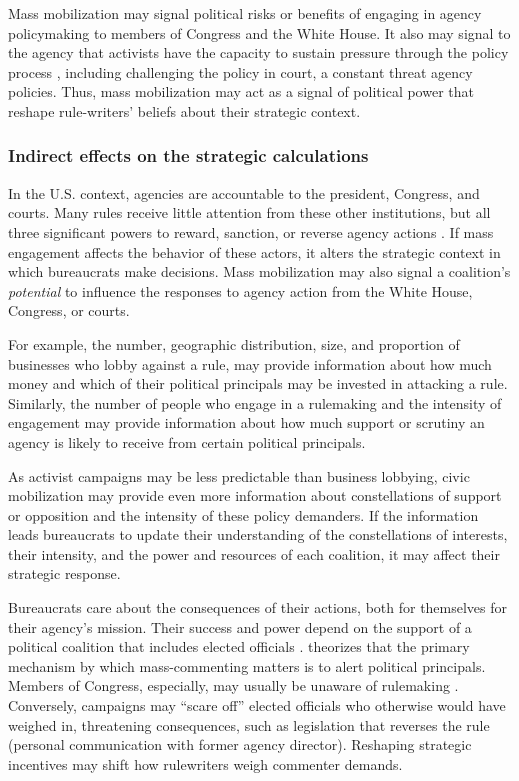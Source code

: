 Mass mobilization may signal political risks or benefits of engaging in agency policymaking to members of Congress and the White House. It also may signal to the agency that activists have the capacity to sustain pressure through the policy process \citep{Coglianese2001}, including challenging the policy in court, a constant threat agency policies. Thus, mass mobilization may act as a signal of political power that  reshape rule-writers' beliefs about their strategic context. 


\subsubsection{Indirect effects on the strategic calculations}
In the U.S. context, agencies are accountable to the president, Congress, and courts. Many rules receive little attention from these other institutions, but all three significant powers to reward, sanction, or reverse agency actions \citep{Yaver2016}. If mass engagement affects the behavior of these actors, it alters the strategic context in which bureaucrats make decisions.
Mass mobilization may also signal a coalition's \textit{potential} to influence the responses to agency action from the White House, Congress, or courts. 

For example, the number, geographic distribution, size, and proportion of businesses who lobby against a rule, may provide information about how much money and which of their political principals may be invested in attacking a rule. Similarly, the number of people who engage in a rulemaking and the intensity of engagement may provide information about how much support or scrutiny an agency is likely to receive from certain political principals. 

As activist campaigns may be less predictable than business lobbying, civic mobilization may provide even more information about constellations of support or opposition and the intensity of these policy demanders. 
If the information leads bureaucrats to update their understanding of the constellations of interests, their intensity, and the power and resources of each coalition, it may affect their strategic response.

Bureaucrats care about the consequences of their actions, both for themselves for their agency’s mission. Their success and power depend on the support of a political coalition that includes elected officials \citep{Carpenter2001}. \citet{West2004} theorizes that the primary mechanism by which mass-commenting matters is to alert political principals. Members of Congress, especially, may usually be unaware of rulemaking \citep{Nou2016}. Conversely, campaigns may ``scare off'' elected officials who otherwise would have weighed in, threatening consequences, such as legislation that reverses the rule (personal communication with former agency director).
Reshaping strategic incentives may shift how rulewriters weigh commenter demands.

